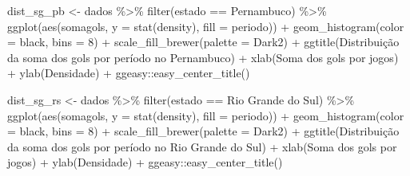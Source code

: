 \documentclass[
]{article}
\newenvironment{Shaded}{\begin{snugshade}}{\end{snugshade}}
\newcommand{\AttributeTok}[1]{\textcolor[rgb]{0.77,0.63,0.00}{#1}}
\newcommand{\DecValTok}[1]{\textcolor[rgb]{0.00,0.00,0.81}{#1}}
\newcommand{\FunctionTok}[1]{\textcolor[rgb]{0.00,0.00,0.00}{#1}}
\newcommand{\NormalTok}[1]{#1}
\newcommand{\OtherTok}[1]{\textcolor[rgb]{0.56,0.35,0.01}{#1}}
\newcommand{\SpecialCharTok}[1]{\textcolor[rgb]{0.00,0.00,0.00}{#1}}
\newcommand{\StringTok}[1]{\textcolor[rgb]{0.31,0.60,0.02}{#1}}
\begin{document}
\begin{Shaded}
\begin{Highlighting}[]
\NormalTok{dist\_sg\_pb }\OtherTok{\textless{}{-}}\NormalTok{ dados }\SpecialCharTok{\%\textgreater{}\%} \FunctionTok{filter}\NormalTok{(estado }\SpecialCharTok{==} \StringTok{\textquotesingle{}Pernambuco\textquotesingle{}}\NormalTok{) }\SpecialCharTok{\%\textgreater{}\%}
  \FunctionTok{ggplot}\NormalTok{(}\FunctionTok{aes}\NormalTok{(somagols, }\AttributeTok{y =} \FunctionTok{stat}\NormalTok{(density), }\AttributeTok{fill =}\NormalTok{ periodo)) }\SpecialCharTok{+} 
  \FunctionTok{geom\_histogram}\NormalTok{(}\AttributeTok{color =} \StringTok{\textquotesingle{}black\textquotesingle{}}\NormalTok{, }\AttributeTok{bins =} \DecValTok{8}\NormalTok{) }\SpecialCharTok{+} 
  \FunctionTok{scale\_fill\_brewer}\NormalTok{(}\AttributeTok{palette =} \StringTok{\textquotesingle{}Dark2\textquotesingle{}}\NormalTok{) }\SpecialCharTok{+}
  \FunctionTok{ggtitle}\NormalTok{(}\StringTok{\textquotesingle{}Distribuição da soma dos gols por período no Pernambuco\textquotesingle{}}\NormalTok{) }\SpecialCharTok{+}
  \FunctionTok{xlab}\NormalTok{(}\StringTok{\textquotesingle{}Soma dos gols por jogos\textquotesingle{}}\NormalTok{) }\SpecialCharTok{+} \FunctionTok{ylab}\NormalTok{(}\StringTok{\textquotesingle{}Densidade\textquotesingle{}}\NormalTok{) }\SpecialCharTok{+}
\NormalTok{  ggeasy}\SpecialCharTok{::}\FunctionTok{easy\_center\_title}\NormalTok{()}

\NormalTok{dist\_sg\_rs }\OtherTok{\textless{}{-}}\NormalTok{ dados }\SpecialCharTok{\%\textgreater{}\%} \FunctionTok{filter}\NormalTok{(estado }\SpecialCharTok{==} \StringTok{\textquotesingle{}Rio Grande do Sul\textquotesingle{}}\NormalTok{) }\SpecialCharTok{\%\textgreater{}\%}
  \FunctionTok{ggplot}\NormalTok{(}\FunctionTok{aes}\NormalTok{(somagols, }\AttributeTok{y =} \FunctionTok{stat}\NormalTok{(density), }\AttributeTok{fill =}\NormalTok{ periodo)) }\SpecialCharTok{+} 
  \FunctionTok{geom\_histogram}\NormalTok{(}\AttributeTok{color =} \StringTok{\textquotesingle{}black\textquotesingle{}}\NormalTok{, }\AttributeTok{bins =} \DecValTok{8}\NormalTok{) }\SpecialCharTok{+} 
  \FunctionTok{scale\_fill\_brewer}\NormalTok{(}\AttributeTok{palette =} \StringTok{\textquotesingle{}Dark2\textquotesingle{}}\NormalTok{) }\SpecialCharTok{+}
  \FunctionTok{ggtitle}\NormalTok{(}\StringTok{\textquotesingle{}Distribuição da soma dos gols por período no Rio Grande do Sul\textquotesingle{}}\NormalTok{) }\SpecialCharTok{+}
  \FunctionTok{xlab}\NormalTok{(}\StringTok{\textquotesingle{}Soma dos gols por jogos\textquotesingle{}}\NormalTok{) }\SpecialCharTok{+} \FunctionTok{ylab}\NormalTok{(}\StringTok{\textquotesingle{}Densidade\textquotesingle{}}\NormalTok{) }\SpecialCharTok{+}
\NormalTok{  ggeasy}\SpecialCharTok{::}\FunctionTok{easy\_center\_title}\NormalTok{()}


\end{Highlighting}
\end{Shaded}
\end{document}
